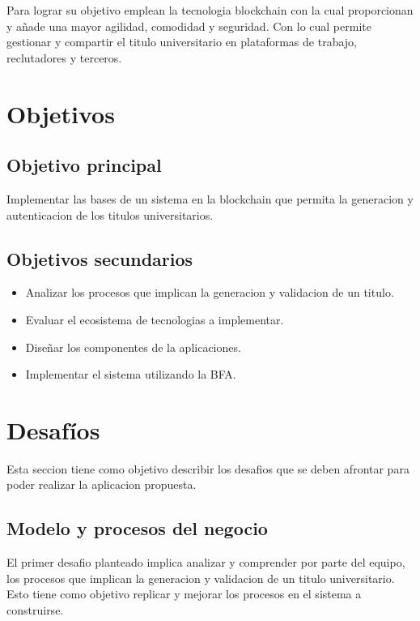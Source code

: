 \documentclass[11pt,a4paper]{article}
\begin{document}
        Para lograr su objetivo emplean la tecnologia blockchain con la cual proporcionan y añade una mayor agilidad,
        comodidad y seguridad. Con lo cual permite gestionar y compartir el titulo universitario en plataformas de trabajo, 
        reclutadores y terceros.


    \section{Objetivos}

        \subsection{Objetivo principal}

        Implementar las bases de un sistema en la blockchain que permita la generacion 
        y autenticacion de los titulos universitarios. 
        
        \subsection{Objetivos secundarios}

        \begin{itemize}
            \item Analizar los procesos que implican la generacion y validacion de un titulo.
            \item Evaluar el ecosistema de tecnologias a implementar.
            \item Diseñar los componentes de la aplicaciones.
            \item Implementar el sistema utilizando la BFA. 
        \end{itemize}


    \section{Desafíos}

        Esta seccion tiene como objetivo describir los desafios que se deben afrontar para poder realizar la aplicacion propuesta.

        \subsection{Modelo y procesos del negocio} 

            El primer desafio planteado implica analizar y comprender por parte del equipo, los procesos que implican la 
            generacion y validacion de un titulo universitario. Esto tiene como objetivo replicar y mejorar los procesos 
            en el sistema a construirse.
        
\end{document}
